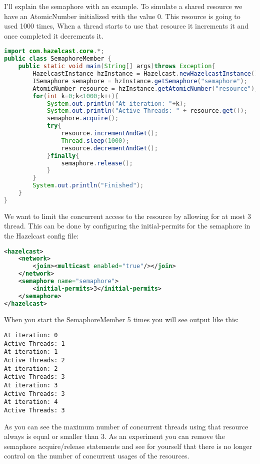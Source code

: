 I'll explain the semaphore with an example. To simulate a shared resource we have an AtomicNumber initialized with the value 0. This resource is going to used 1000 times, When a thread starts to use that resource it increments it and once completed it decrements it.
\begin{lstlisting}[language=java]
import com.hazelcast.core.*;
public class SemaphoreMember {
    public static void main(String[] args)throws Exception{
        HazelcastInstance hzInstance = Hazelcast.newHazelcastInstance();
        ISemaphore semaphore = hzInstance.getSemaphore("semaphore");
        AtomicNumber resource = hzInstance.getAtomicNumber("resource");
        for(int k=0;k<1000;k++){
            System.out.println("At iteration: "+k);
            System.out.println("Active Threads: " + resource.get());
            semaphore.acquire();
            try{
                resource.incrementAndGet();
                Thread.sleep(1000);
                resource.decrementAndGet();
            }finally{
                semaphore.release();
            }
        }
        System.out.println("Finished");
    }
}
\end{lstlisting}
We want to limit the concurrent access to the resource by allowing for at most 3 thread. This can be done by configuring the initial-permits for the semaphore in the Hazelcast config file:
\begin{lstlisting}[language=xml]
<hazelcast>
    <network>
        <join><multicast enabled="true"/></join>
    </network>
    <semaphore name="semaphore">
        <initial-permits>3</initial-permits>
    </semaphore>
</hazelcast>
\end{lstlisting}
When you start the SemaphoreMember 5 times you will see output like this:
\begin{lstlisting}
At iteration: 0
Active Threads: 1
At iteration: 1
Active Threads: 2
At iteration: 2
Active Threads: 3
At iteration: 3
Active Threads: 3
At iteration: 4
Active Threads: 3
\end{lstlisting}
As you can see the maximum number of concurrent threads using that resource always is equal or smaller than 3. As an experiment you can remove the semaphore acquire/release statements and see for yourself that there is no longer control on the number of concurrent usages of the resources.

